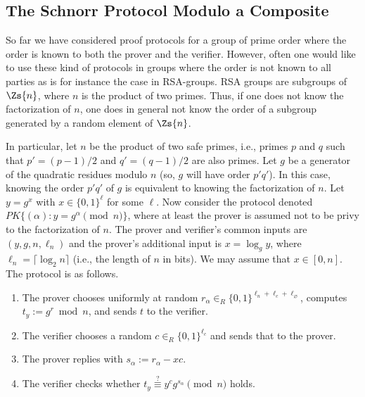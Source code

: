 %


\subsection{The Schnorr Protocol Modulo a Composite}  
\label{The Schnorr Protocol Modulo a Composite.}  
\label{sec:proto}

So far we have considered proof protocols for a group of prime order where the order is
known to both the prover and the verifier.
However, often one would like to use these kind of protocols in groups
where the order is not known to all parties as is for instance the case
in RSA-groups.
RSA groups are subgroups of $\Zs{n}$, where $n$ is the product of two primes.
Thus, if one does not know the factorization of $n$, one does in general
not know the order of a subgroup generated by a random element of $\Zs{n}$.

In particular, let $n$ be the product of two safe primes, i.e., primes $p$ and $q$ such that
$p'=(p-1)/2$ and $q'=(q-1)/2$ are also primes.
Let $g$ be a generator of the quadratic residues modulo $n$ (so, $g$ will have order
$p'q'$).
In this case, knowing the order $p'q'$ of $g$ is equivalent to knowing the factorization of $n$.
Let $y=g^x$ with $x \in \{0,1\}^\ell$ for some $\ell$.
Now consider the protocol denoted $\textit{PK}\{(\alpha): y = g^\alpha \pmod{n}\}$, where 
at least the prover is assumed not to be  privy to the factorization of $n$.
The prover and verifier's common inputs are $(y,g,n,\ell_n)$ and the prover's additional input is
$x = \log_g y$, where $\ell_n = \lceil \log_2 n \rceil$ (i.e., the length of $n$ in bits). 
We may assume that $x \in [0,n]$.
The protocol is as follows.
\begin{enumerate}
\item The prover chooses uniformly at random $r_\alpha  \in_R \{0,1\}^{\ell_n+\ell_c + \ell_\varnothing}$,
computes $t_y := g^r \bmod{n}$, and sends $t$ to the verifier.
\item The verifier chooses a random $c \in_R \{0,1\}^{\ell_c}$ and sends that to the 
prover.
\item The prover replies with $s_\alpha := r_\alpha - xc$.
\item The verifier checks whether $t_y \stackrel{?}{\equiv} y^c g^{s_\alpha} \pmod{n}$ holds.
\end{enumerate}

